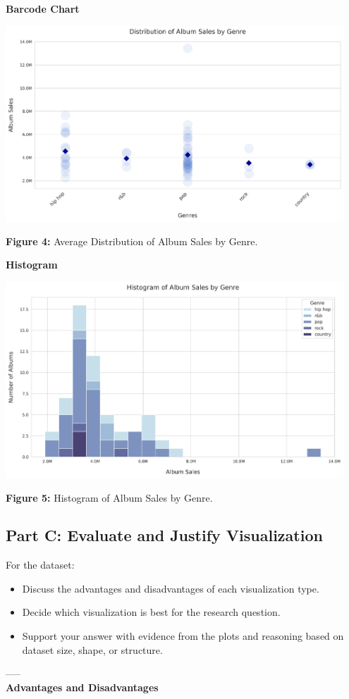 \textbf{Barcode Chart}
\begin{center}
  \includegraphics[width=0.95\textwidth]{figures/album_sales_by_genre_strip_plot.png}
  
  \textbf{Figure 4:} Average Distribution of Album Sales by Genre.
\end{center}

\textbf{Histogram}
\begin{center}
  \includegraphics[width=0.95\textwidth]{figures/album_sales_by_genre_histogram_plot.png}
  
  \textbf{Figure 5:} Histogram of Album Sales by Genre.
\end{center}
\newpage

\subsection{Part C: Evaluate and Justify Visualization}
For the dataset:
\begin{itemize}
    \item Discuss the advantages and disadvantages of each visualization type.
    \item Decide which visualization is best for the research question.
    \item Support your answer with evidence from the plots and reasoning based on dataset size, shape, or structure.
\end{itemize}
-----\\
\textbf{Advantages and Disadvantages}\\

